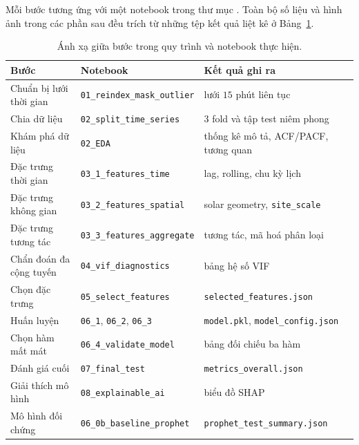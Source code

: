 \documentclass[12pt, a4paper]{report}
\begin{document}
Mỗi bước tương ứng với một notebook trong thư mục
. Toàn bộ số liệu và hình ảnh trong các phần
sau đều trích từ những tệp kết quả liệt kê ở Bảng~\ref{tab:notebook_pipeline}.

\begin{table}[htbp]
\centering

\footnotesize
\renewcommand{\baselinestretch}{1.0}\selectfont
\begin{tabular}{@{}p{3.4cm} p{4.6cm} p{5.4cm}@{}}
\toprule
\textbf{Bước} & \textbf{Notebook} & \textbf{Kết quả ghi ra} \\
\midrule
Chuẩn bị lưới thời gian & \texttt{01\_reindex\_mask\_outlier} & lưới $15$ phút liên tục \\
Chia dữ liệu & \texttt{02\_split\_time\_series} & $3$ fold và tập test niêm phong \\
Khám phá dữ liệu & \texttt{02\_EDA} & thống kê mô tả, ACF/PACF, tương quan \\
Đặc trưng thời gian & \texttt{03\_1\_features\_time} & lag, rolling, chu kỳ lịch \\
Đặc trưng không gian & \texttt{03\_2\_features\_spatial} & solar geometry, \texttt{site\_scale} \\
Đặc trưng tương tác & \texttt{03\_3\_features\_aggregate} & tương tác, mã hoá phân loại \\
Chẩn đoán đa cộng tuyến & \texttt{04\_vif\_diagnostics} & bảng hệ số VIF \\
Chọn đặc trưng & \texttt{05\_select\_features} & \texttt{selected\_features.json} \\
Huấn luyện & \texttt{06\_1}, \texttt{06\_2}, \texttt{06\_3} & \texttt{model.pkl}, \texttt{model\_config.json} \\
Chọn hàm mất mát & \texttt{06\_4\_validate\_model} & bảng đối chiếu ba hàm \\
Đánh giá cuối & \texttt{07\_final\_test} & \texttt{metrics\_overall.json} \\
Giải thích mô hình & \texttt{08\_explainable\_ai} & biểu đồ SHAP \\
Mô hình đối chứng & \texttt{06\_0b\_baseline\_prophet} & \texttt{prophet\_test\_summary.json} \\
\bottomrule
\end{tabular}
\caption[Ánh xạ giữa bước trong quy trình và notebook thực hiện]{Ánh xạ giữa bước trong quy trình và notebook thực hiện.}
\label{tab:notebook_pipeline}
\end{table}
\end{document}
